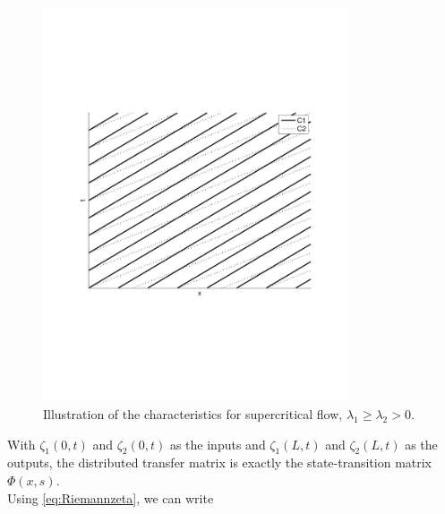 \documentclass[preprint]{elsarticle}
\begin{document}
\begin{figure}[H] 
\centering
\includegraphics[trim= 0mm 75mm 0mm 70mm, width = 90mm]{supercr}
\caption{Illustration of the characteristics for supercritical flow, $\lambda_1 \geq \lambda_2 > 0$.}
\label{fig:supercr}
\end{figure}

With $\zeta_1 (0,t)$ and $\zeta_2 (0,t)$ as the inputs and $\zeta_1(L,t)$ and $\zeta_2(L,t)$ as the outputs, the distributed transfer matrix is exactly the state-transition matrix $\Phi(x,s)$.\\

Using \eqref{eq:Riemannzeta}, we can write
\end{document}

